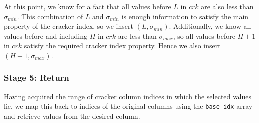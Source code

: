 At this point, we know for a fact that all values before $L$ in $crk$ are also less than $\sigma _{min}$. This combination of $L$ and $\sigma _{min}$ is enough information to satisfy the main property of the cracker index, so we insert $(L, \sigma _{min})$. Additionally, we know all values before and including $H$ in $crk$ are less than $\sigma _{max}$, so all values before $H+1$ in $crk$ satisfy the required cracker index property. Hence we also insert $(H + 1, \sigma _{max})$.

\subsubsection{Stage 5: Return}

Having acquired the range of cracker column indices in which the selected values lie, we map this back to indices of the original columns using the \texttt{base\_idx} array and retrieve values from the desired column.
